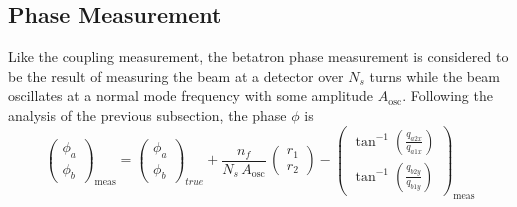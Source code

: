 \subsection{Phase Measurement}
\label{Phase!measurement}

Like the coupling measurement, the betatron phase measurement is
considered to be the result of measuring the beam at a detector over
$N_s$ turns while the beam oscillates at a normal mode frequency with
some amplitude $A_{\text{osc}}$.  Following the analysis of the
previous subsection, the phase $\phi$ is
\begin{equation}
  \begin{pmatrix}
    \phi_a \\
    \phi_b
  \end{pmatrix}_{\! \text{meas}}
  =
  \begin{pmatrix}
    \phi_a \\
    \phi_b
  \end{pmatrix}_{\! true}
  +
  \frac{n_f}{N_s \, A_{\text{osc}}} \, 
  \begin{pmatrix}
    r_1 \\ 
    r_2
  \end{pmatrix}
  -
  \begin{pmatrix}
    \tan^{-1} \left( \frac{q_{a2x}}{q_{a1x}} \right) \\
    \tan^{-1} \left( \frac{q_{b2y}}{q_{b1y}} \right)
  \end{pmatrix}_{\! \text{meas}}
\end{equation}
